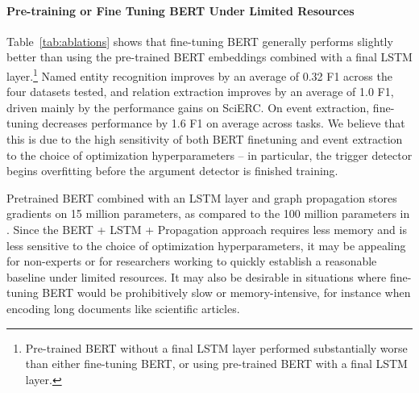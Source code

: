 \documentclass[11pt,a4paper]{article}
\begin{document}
\paragraph{Pre-training or Fine Tuning BERT Under Limited Resources}
Table~\ref{tab:ablations} shows that fine-tuning BERT generally performs slightly better than using the pre-trained BERT embeddings combined with a final LSTM layer.\footnote{Pre-trained BERT without a final LSTM layer performed substantially worse than either fine-tuning BERT, or using pre-trained BERT with a final LSTM layer.} Named entity recognition improves by an average of 0.32 F1 across the four datasets tested, and relation extraction improves by an average of 1.0 F1, driven mainly by the performance gains on SciERC. On event extraction, fine-tuning decreases performance by 1.6 F1 on average across tasks. We believe that this is due to the high sensitivity of both BERT finetuning and event extraction to the choice of optimization hyperparameters -- in particular, the trigger detector begins overfitting before the argument detector is finished training.

Pretrained BERT combined with an LSTM layer and graph propagation stores gradients on 15 million parameters, as compared to the 100 million parameters in .
Since the BERT + LSTM + Propagation approach requires less memory and is less sensitive to the choice of optimization hyperparameters, it may be appealing for non-experts or for researchers working to quickly establish a reasonable baseline under limited resources. It may also be desirable in situations where fine-tuning BERT would be prohibitively slow or memory-intensive, for instance when encoding long documents like scientific articles.
\vspace{-.2cm}
\end{document}
